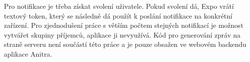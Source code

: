 Pro notifikace je třeba získat svolení uživatele. Pokud svolení dá, Expo vrátí textový token, který se následně dá použít k poslání notifikace na konkrétní zařízení. Pro zjednodušení práce s větším počtem stejných notifikací je možnost vytvářet skupiny příjemců, aplikace ji nevyužívá. Kód pro generování zpráv na straně serveru není součástí této práce a je pouze obsažen ve webovém backendu aplikace Anitra.



